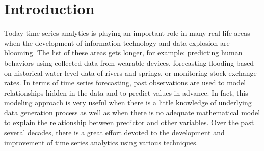 \documentclass[smallcondensed, natbib]{svjour3}     %
\begin{document}





\section{Introduction}
\label{intro}
Today time series analytics is playing an important role in many real-life areas when the development of information technology and data explosion are blooming. The list of these areas gets longer, for example: predicting human behaviors using collected data from wearable devices, forecasting flooding based on historical water level data of rivers and springs, or monitoring stock exchange rates. In terms of time series forecasting, past observations are used to model relationships hidden in the data and to predict values in advance. In fact, this modeling approach is very useful when there is a little knowledge of underlying data generation process as well as when there is no adequate mathematical model to explain the relationship between predictor and other variables. Over the past several decades, there is a great effort devoted to the development and improvement of time series analytics using various techniques.

%
\end{document}
